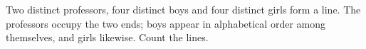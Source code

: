 Two distinct professors, four distinct boys and four distinct girls form a line. The professors occupy the two ends; boys appear in alphabetical order among themselves, and girls likewise. Count the lines.
